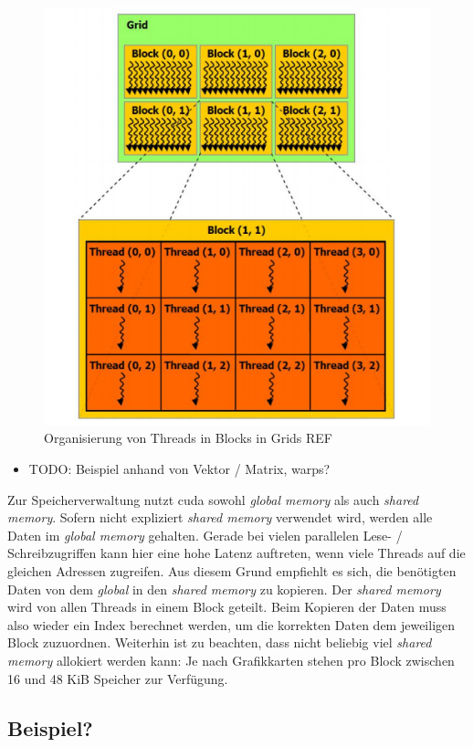 \begin{figure}
	\centering
	\includegraphics[scale=0.55]{images/cuda1.png}
	\caption{Organisierung von Threads in Blocks in Grids REF}
	\label{img:cuda1}
\end{figure}

\begin{itemize}
	\item TODO: Beispiel anhand von Vektor / Matrix, warps?
\end{itemize}

Zur Speicherverwaltung nutzt cuda sowohl \textit{global memory} als auch \textit{shared memory}. Sofern nicht expliziert \textit{shared memory} verwendet wird, werden alle Daten im \textit{global memory} gehalten. Gerade bei vielen parallelen Lese- / Schreibzugriffen kann hier eine hohe Latenz auftreten, wenn viele Threads auf die gleichen Adressen zugreifen. Aus diesem Grund empfiehlt es sich, die benötigten Daten von dem \textit{global} in den \textit{shared memory} zu kopieren. Der \textit{shared memory} wird von allen Threads in einem Block geteilt. Beim Kopieren der Daten muss also wieder ein Index berechnet werden, um die korrekten Daten dem jeweiligen Block zuzuordnen. Weiterhin ist zu beachten, dass nicht beliebig viel \textit{shared memory} allokiert werden kann: Je nach Grafikkarten stehen pro Block zwischen 16 und 48 KiB Speicher zur Verfügung.

\subsection{Beispiel?}